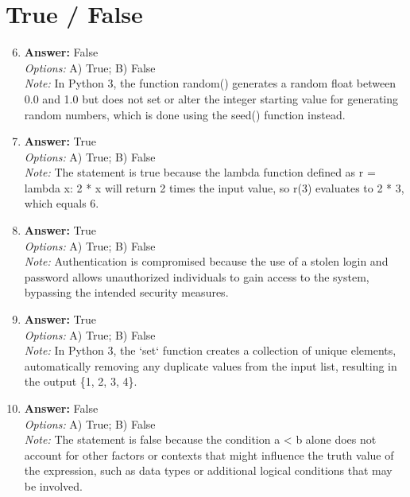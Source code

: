 \documentclass[12pt]{article}
\begin{document}
\section*{True / False}
\begin{enumerate}[label=\arabic*.]
\setcounter{enumi}{5}
\item \textbf{Answer:} False
\\ \textit{Options:} A) True; B) False
\\ \textit{Note:} In Python 3, the function random() generates a random float between 0.0 and 1.0 but does not set or alter the integer starting value for generating random numbers, which is done using the seed() function instead.
\item \textbf{Answer:} True
\\ \textit{Options:} A) True; B) False
\\ \textit{Note:} The statement is true because the lambda function defined as r = lambda x: 2 * x will return 2 times the input value, so r(3) evaluates to 2 * 3, which equals 6.
\item \textbf{Answer:} True
\\ \textit{Options:} A) True; B) False
\\ \textit{Note:} Authentication is compromised because the use of a stolen login and password allows unauthorized individuals to gain access to the system, bypassing the intended security measures.
\item \textbf{Answer:} True
\\ \textit{Options:} A) True; B) False
\\ \textit{Note:} In Python 3, the `set` function creates a collection of unique elements, automatically removing any duplicate values from the input list, resulting in the output \{1, 2, 3, 4\}.
\item \textbf{Answer:} False
\\ \textit{Options:} A) True; B) False
\\ \textit{Note:} The statement is false because the condition a \textless{} b alone does not account for other factors or contexts that might influence the truth value of the expression, such as data types or additional logical conditions that may be involved.
\end{enumerate}
\end{document}
